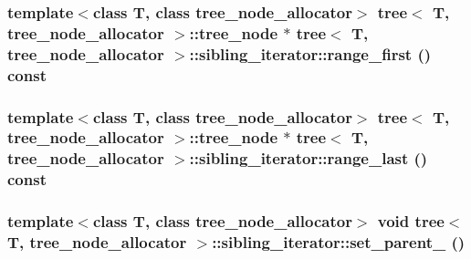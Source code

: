 \hypertarget{classtree_1_1sibling__iterator_faed5294cdf5a6679c788fff0196c2a8}{
\subsubsection{\setlength{\rightskip}{0pt plus 5cm}template$<$class T, class tree\_\-node\_\-allocator$>$ {\bf tree}$<$ T, tree\_\-node\_\-allocator $>$::{\bf tree\_\-node} $\ast$ {\bf tree}$<$ T, tree\_\-node\_\-allocator $>$::sibling\_\-iterator::range\_\-first () const}}
\label{classtree_1_1sibling__iterator_faed5294cdf5a6679c788fff0196c2a8}


\hypertarget{classtree_1_1sibling__iterator_85438655c23ba60d2a4f83787e3dcf48}{
\subsubsection{\setlength{\rightskip}{0pt plus 5cm}template$<$class T, class tree\_\-node\_\-allocator$>$ {\bf tree}$<$ T, tree\_\-node\_\-allocator $>$::{\bf tree\_\-node} $\ast$ {\bf tree}$<$ T, tree\_\-node\_\-allocator $>$::sibling\_\-iterator::range\_\-last () const}}
\label{classtree_1_1sibling__iterator_85438655c23ba60d2a4f83787e3dcf48}


\hypertarget{classtree_1_1sibling__iterator_1ccee36d637d78bd30be98a20d582f0e}{
\subsubsection{\setlength{\rightskip}{0pt plus 5cm}template$<$class T, class tree\_\-node\_\-allocator$>$ void {\bf tree}$<$ T, tree\_\-node\_\-allocator $>$::sibling\_\-iterator::set\_\-parent\_\- ()}}
\label{classtree_1_1sibling__iterator_1ccee36d637d78bd30be98a20d582f0e}




